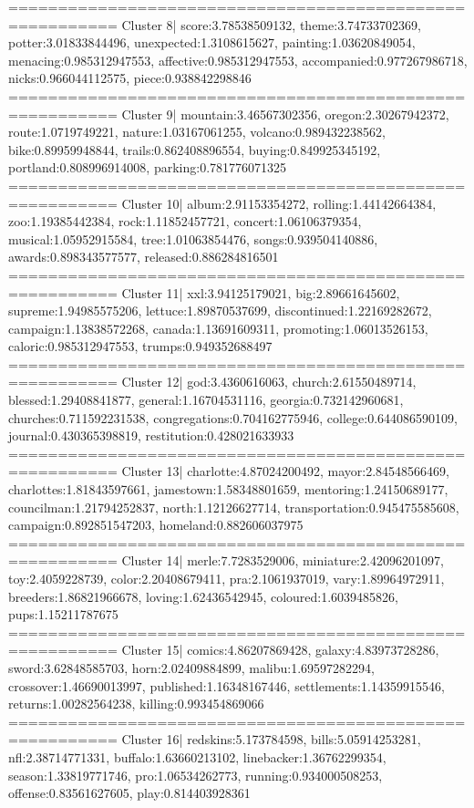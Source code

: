========================================================= 
Cluster 8| score:3.78538509132, theme:3.74733702369, potter:3.01833844496, unexpected:1.3108615627, painting:1.03620849054, menacing:0.985312947553, affective:0.985312947553, accompanied:0.977267986718, nicks:0.966044112575, piece:0.938842298846
========================================================= 
Cluster 9| mountain:3.46567302356, oregon:2.30267942372, route:1.0719749221, nature:1.03167061255, volcano:0.989432238562, bike:0.89959948844, trails:0.862408896554, buying:0.849925345192, portland:0.808996914008, parking:0.781776071325
========================================================= 
Cluster 10| album:2.91153354272, rolling:1.44142664384, zoo:1.19385442384, rock:1.11852457721, concert:1.06106379354, musical:1.05952915584, tree:1.01063854476, songs:0.939504140886, awards:0.898343577577, released:0.886284816501
========================================================= 
Cluster 11| xxl:3.94125179021, big:2.89661645602, supreme:1.94985575206, lettuce:1.89870537699, discontinued:1.22169282672, campaign:1.13838572268, canada:1.13691609311, promoting:1.06013526153, caloric:0.985312947553, trumps:0.949352688497
========================================================= 
Cluster 12| god:3.4360616063, church:2.61550489714, blessed:1.29408841877, general:1.16704531116, georgia:0.732142960681, churches:0.711592231538, congregations:0.704162775946, college:0.644086590109, journal:0.430365398819, restitution:0.428021633933
========================================================= 
Cluster 13| charlotte:4.87024200492, mayor:2.84548566469, charlottes:1.81843597661, jamestown:1.58348801659, mentoring:1.24150689177, councilman:1.21794252837, north:1.12126627714, transportation:0.945475585608, campaign:0.892851547203, homeland:0.882606037975
========================================================= 
Cluster 14| merle:7.7283529006, miniature:2.42096201097, toy:2.4059228739, color:2.20408679411, pra:2.1061937019, vary:1.89964972911, breeders:1.86821966678, loving:1.62436542945, coloured:1.6039485826, pups:1.15211787675
========================================================= 
Cluster 15| comics:4.86207869428, galaxy:4.83973728286, sword:3.62848585703, horn:2.02409884899, malibu:1.69597282294, crossover:1.46690013997, published:1.16348167446, settlements:1.14359915546, returns:1.00282564238, killing:0.993454869066
========================================================= 
Cluster 16| redskins:5.173784598, bills:5.05914253281, nfl:2.38714771331, buffalo:1.63660213102, linebacker:1.36762299354, season:1.33819771746, pro:1.06534262773, running:0.934000508253, offense:0.83561627605, play:0.814403928361
